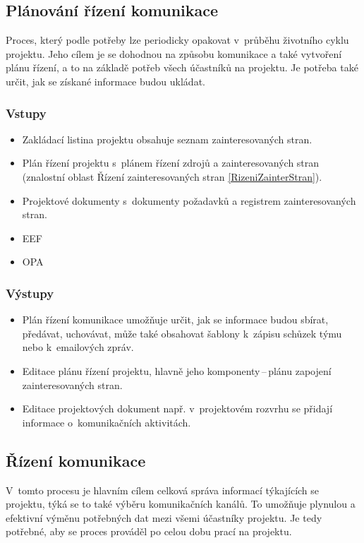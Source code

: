 \subsection*{Plánování řízení komunikace}

Proces, který podle potřeby lze periodicky opakovat v~průběhu životního cyklu projektu. Jeho cílem je se dohodnou na způsobu komunikace a také vytvoření plánu řízení, a to na základě potřeb všech účastníků na projektu. Je potřeba také určit, jak se získané informace budou ukládat. 

\subsubsection*{Vstupy}
\begin{itemize}
    \item Zakládací listina projektu obsahuje seznam zainteresovaných stran.
    \item Plán řízení projektu s~plánem řízení zdrojů a zainteresovaných stran (znalostní oblast Řízení zainteresovaných stran \ref{RizeniZainterStran}).
    \item Projektové dokumenty s~dokumenty požadavků a registrem zainteresovaných stran.
    \item EEF
    \item OPA
\end{itemize}
\subsubsection*{Výstupy}
\begin{itemize}
    \item Plán řízení komunikace umožňuje určit, jak se informace budou sbírat, předávat, uchovávat, může také obsahovat šablony k~zápisu schůzek týmu nebo k~emailových zpráv.
    \item Editace plánu řízení projektu, hlavně jeho komponenty\,--\,plánu zapojení zainteresovaných stran.
    \item Editace projektových dokument např. v~projektovém rozvrhu se přidají informace o~komunikačních aktivitách.
\end{itemize}

\subsection*{Řízení komunikace}

V~tomto procesu je hlavním cílem celková správa informací týkajících se projektu, týká se to také výběru komunikačních kanálů. To umožňuje plynulou a efektivní výměnu potřebných dat mezi všemi účastníky projektu. Je tedy potřebné, aby se proces prováděl po celou dobu prací na projektu.

